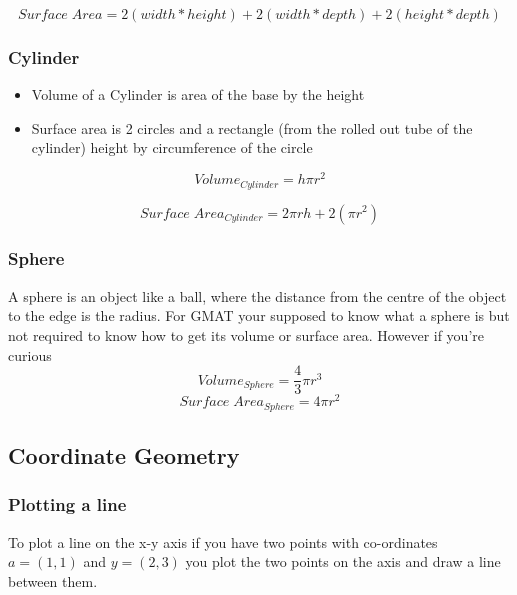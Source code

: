 \documentclass{article}
\begin{document}
\begin{equation}
Surface\;Area = 2(width * height) + 2(width * depth) + 2(height * depth)
\end{equation}

\subsubsection{Cylinder}
\begin{itemize}
\item Volume of a Cylinder is area of the base by the height
\item Surface area is 2 circles and a rectangle (from the rolled out tube of the cylinder) height by circumference of the circle
\end{itemize}

\begin{equation}
Volume_{ Cylinder} = h \pi r^ 2
\end{equation}


\begin{equation}
Surface\;Area_{ Cylinder} = 2 \pi r h + 2(\pi r^ 2 )
\end{equation}

\subsubsection{Sphere}
A sphere is an object like a ball, where the distance from the centre of the object to the edge is the radius. For GMAT your supposed to know what a sphere is but not required to know how to get its volume or surface area.
However if you're curious 
\begin{equation}
Volume_{Sphere} = \frac{4}{3} \pi r^{3}
\end{equation}
\begin{equation}
Surface\;Area_{Sphere} = 4 \pi r^{2}
\end{equation}

\newpage
\subsection{Coordinate Geometry}
\subsubsection{Plotting a line}
To plot a line on the x-y axis if you have two points with co-ordinates $a = (1,1)$ and $y = (2,3)$ you plot the two points on the axis and draw a line between them.
\end{document}
